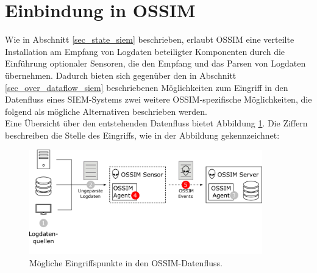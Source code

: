 \section{Einbindung in OSSIM}

\label{sec_impl_integration_into_ossim}

%
%
%
%

Wie in Abschnitt \ref{sec_state_siem} beschrieben, erlaubt OSSIM eine verteilte Installation am Empfang von Logdaten beteiligter Komponenten durch die Einführung optionaler Sensoren, die den Empfang und das Parsen von Logdaten übernehmen. Dadurch bieten sich gegenüber den in Abschnitt \ref{sec_over_dataflow_siem} beschriebenen Möglichkeiten zum Eingriff in den Datenfluss eines SIEM-Systems zwei weitere OSSIM-spezifische Möglichkeiten, die folgend als mögliche Alternativen beschrieben werden.\\
Eine Übersicht über den entstehenden Datenfluss bietet Abbildung \ref{fig:ossim_data_access_point}. Die Ziffern beschreiben die Stelle des Eingriffs, wie in der Abbildung gekennzeichnet:

\begin{figure}[]
    \centering
        \includegraphics[width=0.9\textwidth]{dia/ossim_data_access_point.pdf}
    \caption{Mögliche Eingriffspunkte in den OSSIM-Datenfluss.}
    \label{fig:ossim_data_access_point}
\end{figure}


